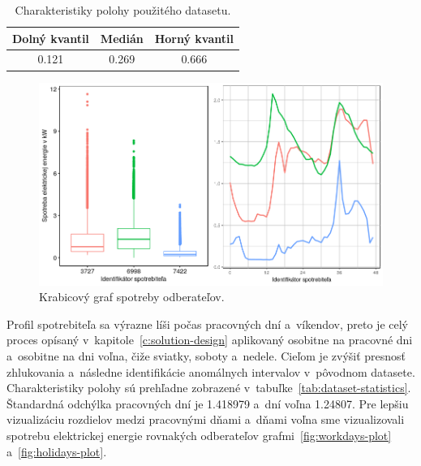 \documentclass[a4paper,twoside,slovak,12pt,appendix]{article}
\begin{document}
\begin{table}[htbp]
  \centering
  \caption{Charakteristiky polohy použitého datasetu.}
  \label{tab:quantile}
  \begin{tabular}{|c|c|c|}
    \hline
    \textbf{Dolný kvantil}  &   \textbf{Medián}		&		\textbf{Horný kvantil} \\ \hline
    0.121								    &   0.269							&		0.666					         \\ \hline
  \end{tabular}
\end{table}

\begin{figure}[htbp]
  \centering
  \includegraphics[width=\textwidth]{sample_plot.png}
  \caption{Krabicový graf spotreby odberateľov.}
  \label{fig:whole-plot}
\end{figure}

\noindent
Profil spotrebiteľa sa výrazne líši počas pracovných dní a~víkendov, preto je
celý proces opísaný v~kapitole~\ref{c:solution-design} aplikovaný osobitne na
pracovné dni a~osobitne na dni voľna, čiže sviatky, soboty a~nedele. Cieľom je
zvýšiť presnosť zhlukovania a~následne identifikácie anomálnych intervalov
v~pôvodnom datasete. Charakteristiky polohy sú prehľadne zobrazené
v~tabuľke~\ref{tab:dataset-statistics}. Štandardná odchýlka pracovných dní je
1.418979 a~dní voľna 1.24807. Pre lepšiu vizualizáciu rozdielov medzi pracovnými
dňami a~dňami voľna sme vizualizovali spotrebu elektrickej energie rovnakých
odberateľov grafmi~\ref{fig:workdays-plot} a~\ref{fig:holidays-plot}.
\end{document}
